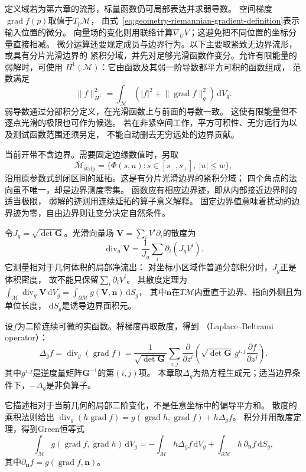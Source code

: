 定义域若为第六章的流形，标量函数仍可局部表达并求弱导数。
空间梯度$\operatorname{grad}f(p)$取值于$T_p\mathcal M$，
由式~\eqref{eq:geometry-riemannian-gradient-definition}表示输入位置的微分。
向量场的变化则用联络计算$\nabla_U V$；这避免把不同位置的坐标分量直接相减。
微分运算还要规定成员与边界行为。以下主要取紧致无边界流形，或具有分片光滑边界的
紧积分域，并先对足够光滑函数作变分。允许有限能量的弱解时，可使用
$H^1(\mathcal M)$：它由函数及其弱一阶导数都平方可积的函数组成，
范数满足
\[
 \lVert f\rVert_{H^1}^2
 =\int_{\mathcal M}(|f|^2+\lVert\operatorname{grad}f\rVert_g^2)\,\mathrm dV_g.
\]
弱导数通过分部积分定义，在光滑函数上与前面的导数一致。
这使有限能量但不逐点光滑的极限也可作为候选。
若在非紧空间工作，平方可积性、无穷远行为以及测试函数范围还须另定，
不能自动删去无穷远处的边界贡献。

当前开带不含边界。需要固定边缘数值时，另取
\[
 \overline{\mathcal M}_{\mathrm{strip}}
 =\{\Phi(s,u):s\in[s_-,s_+],\ |u|\leq w\},
\]
沿用原参数式到闭区间的延拓。这是有分片光滑边界的紧积分域；
四个角点的法向虽不唯一，却是边界测度零集。
函数应有相应边界迹，即从内部接近边界时的适当极限，
弱解的迹则用连续延拓的算子意义解释。
固定边界值意味着扰动的边界迹为零，自由边界则让变分决定自然条件。

令$J_g=\sqrt{\det\bm G}$。光滑向量场
$\bm V=\sum_iV^i\partial_i$的散度为
\[
 \operatorname{div}_g\bm V
 =\frac1{J_g}\sum_i\partial_i(J_gV^i).
\]
它测量相对于几何体积的局部净流出：
对坐标小区域作普通分部积分时，$J_g$正是体积密度，
故不能只保留$\sum_i\partial_iV^i$。
其散度定理为
$\int_{\mathcal M}\operatorname{div}_g\bm V\,\mathrm dV_g
=\int_{\partial\mathcal M}g(\bm V,\bm n)\,\mathrm dS_g$，
其中$\bm n$在$T\mathcal M$内垂直于边界、指向外侧且为单位长度，
$\mathrm dS_g$是诱导边界面积元。

\begin{definition}
\label{def:geometry-laplace-beltrami}
设$f$为二阶连续可微的实函数。将梯度再取散度，得到
（Laplace--Beltrami operator）：
\begin{equation}
 \Delta_g f=\operatorname{div}_g(\operatorname{grad}f)
 =\frac1{\sqrt{\det\bm G}}\sum_{i,j}
  \frac{\partial}{\partial z^i}
   \left(\sqrt{\det\bm G}\,g^{i,j}
                   \frac{\partial f}{\partial z^j}\right).
 \label{eq:geometry-laplace-beltrami}
\end{equation}
其中$g^{i,j}$是逆度量矩阵$\bm G^{-1}$的第$(i,j)$项。
本章取$\Delta_g$为热方程生成元；适当边界条件下，$-\Delta_g$是非负算子。
\end{definition}
它描述相对于当前几何的局部二阶变化，不是任意坐标中的偏导平方和。
散度的乘积法则给出
$\operatorname{div}_g(h\operatorname{grad}f)
=g(\operatorname{grad}h,\operatorname{grad}f)+h\Delta_gf$。
积分并用散度定理，得到Green恒等式
\begin{equation}
 \int_{\mathcal M}g(\operatorname{grad}f,\operatorname{grad}h)\,\mathrm dV_g
 =-\int_{\mathcal M}h\Delta_gf\,\mathrm dV_g
   +\int_{\partial\mathcal M}h\,\partial_{\bm n}f\,\mathrm dS_g,
 \label{eq:geometry-green-identity}
\end{equation}
其中$\partial_{\bm n}f=g(\operatorname{grad}f,\bm n)$。

